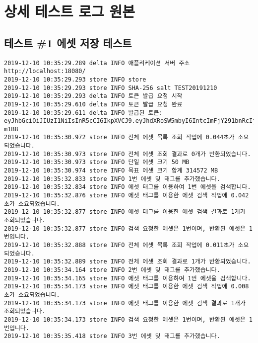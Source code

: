 \chapter{상세 테스트 로그 원본}

\section{테스트 \#1 에셋 저장 테스트}
\begin{Verbatim}[fontsize=\tiny, breaklines=true, breakanywhere=true]
2019-12-10 10:35:29.289 delta INFO 애플리케이션 서버 주소 http://localhost:18080/
2019-12-10 10:35:29.293 store INFO store
2019-12-10 10:35:29.293 store INFO SHA-256 salt TEST20191210
2019-12-10 10:35:29.293 delta INFO 토큰 발급 요청 시작
2019-12-10 10:35:29.610 delta INFO 토큰 발급 요청 완료
2019-12-10 10:35:29.611 delta INFO 발급된 토큰: eyJhbGciOiJIUzI1NiIsInR5cCI6IkpXVCJ9.eyJhdXRoSW5mbyI6IntcImFjY291bnRcIjp7XCJpZFwiOjEsXCJ1c2VybmFtZVwiOlwiRGVmYXVsdEFkbWluVXNlclwifSxcInJvbGVcIjpcIkFkbWluXCJ9IiwianRpIjoiMzYzZDk4YWY0MTQwZGE3YjI1MGE0M2Y0ZWI5ZWE0Njk1NDlhMTZkZmYzYWE2ZDE3YWMzZDRjZjJkYThlODEzYSIsImlzcyI6IkRlbHRhLkFwcFNlcnZlciIsImF1ZCI6IkRlbHRhLkFwcFNlcnZlciJ9.MglGLMp62OJTTTvzvZDRIzw1xmbAIGsfz9rd1z-m1B8
2019-12-10 10:35:30.972 store INFO 전체 에셋 목록 조회 작업에 0.044초가 소요되었습니다.
2019-12-10 10:35:30.973 store INFO 전체 에셋 조회 결과로 0개가 반환되었습니다.
2019-12-10 10:35:30.973 store INFO 단일 에셋 크기 50 MB
2019-12-10 10:35:30.974 store INFO 목표 에셋 크기 합계 314572 MB
2019-12-10 10:35:32.833 store INFO 1번 에셋 및 태그를 추가했습니다.
2019-12-10 10:35:32.834 store INFO 에셋 태그를 이용하여 1번 에셋을 검색합니다.
2019-12-10 10:35:32.876 store INFO 에셋 태그를 이용한 에셋 검색 작업에 0.042초가 소요되었습니다.
2019-12-10 10:35:32.877 store INFO 에셋 태그를 이용한 에셋 검색 결과로 1개가 조회되었습니다.
2019-12-10 10:35:32.877 store INFO 검색 요청한 에셋은 1번이며, 반환된 에셋은 1번입니다.
2019-12-10 10:35:32.888 store INFO 전체 에셋 목록 조회 작업에 0.011초가 소요되었습니다.
2019-12-10 10:35:32.889 store INFO 전체 에셋 조회 결과로 1개가 반환되었습니다.
2019-12-10 10:35:34.164 store INFO 2번 에셋 및 태그를 추가했습니다.
2019-12-10 10:35:34.165 store INFO 에셋 태그를 이용하여 1번 에셋을 검색합니다.
2019-12-10 10:35:34.173 store INFO 에셋 태그를 이용한 에셋 검색 작업에 0.008초가 소요되었습니다.
2019-12-10 10:35:34.173 store INFO 에셋 태그를 이용한 에셋 검색 결과로 1개가 조회되었습니다.
2019-12-10 10:35:34.173 store INFO 검색 요청한 에셋은 1번이며, 반환된 에셋은 1번입니다.
2019-12-10 10:35:35.418 store INFO 3번 에셋 및 태그를 추가했습니다.

\end{Verbatim}
